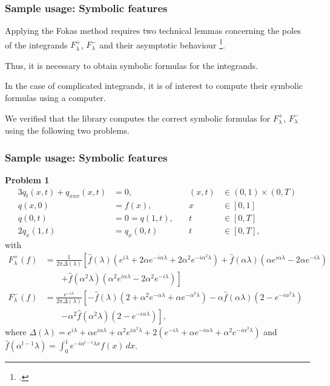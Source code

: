 \documentclass{beamer}
\begin{document}
\begin{frame}
    \frametitle{Sample usage: Symbolic features}
    Applying the Fokas method requires two technical lemmas concerning the poles of the integrands $F_\lambda^+$, $F_\lambda^-$ and their asymptotic behaviour \footcite{Miller2018}. 
    \newline

    Thus, it is necessary to obtain symbolic formulas for the integrands. 
    \newline

    In the case of complicated integrands, it is of interest to compute their symbolic formulas using a computer.
    \newline

    We verified that the library computes the correct symbolic formulas for $F_\lambda^+$, $F_\lambda^-$ using the following two problems.
\end{frame}

\begin{frame}
    \frametitle{Sample usage: Symbolic features}
    \textbf{Problem 1}
    \small
    \begin{alignat*}{3}
        q_t(x,t) + q_{xxx}(x,t) &= 0,\quad &(x,t)&\in (0,1)\times (0,T)\\
        q(x,0) &= f(x),\quad &x&\in [0,1]\\
        q(0,t) &= 0 = q(1,t), \quad &t&\in [0,T]\\
        2q_x(1,t) &= q_x(0,t)\quad &t&\in [0,T],
        \end{alignat*}
        with
        \begin{align*}
        F_\lambda^+(f) &= \frac{1}{2\pi\Delta(\lambda)}\left[\hat{f}(\lambda)(e^{i\lambda} + 2\alpha e^{-i\alpha\lambda} + 2\alpha^2 e^{-i\alpha^2\lambda}) + \hat{f}(\alpha\lambda)(\alpha e^{i\alpha\lambda} - 2\alpha e^{-i\lambda}) \right.\\
        &\qquad \left. + \hat{f}(\alpha^2\lambda)(\alpha^2e^{i\alpha\lambda} - 2\alpha^2e^{-i\lambda})\right]\\
        F_\lambda^-(f) &= \frac{e^{-i\lambda}}{2\pi\Delta(\lambda)}\left[-\hat{f}(\lambda)(2+\alpha^2 e^{-\alpha\lambda} + \alpha e^{-\alpha^2\lambda}) - \alpha\hat{f}(\alpha\lambda)(2-e^{-i\alpha^2\lambda}) \right.\\ 
        &\qquad \left. - \alpha^2\hat{f}(\alpha^2\lambda)(2-e^{-i\alpha\lambda})\right],
        \end{align*}
        where $\Delta(\lambda) = e^{i\lambda} + \alpha e^{i\alpha\lambda} + \alpha^2 e^{i\alpha^2\lambda} + 2(e^{-i\lambda} + \alpha e^{-i\alpha\lambda} + \alpha^2e^{-i\alpha^2\lambda})$ and $\hat{f}(\alpha^{l-1}\lambda) = \int_0^1 e^{-i\alpha^{l-1}\lambda x}f(x)\,dx$.
\end{frame}
\end{document}
